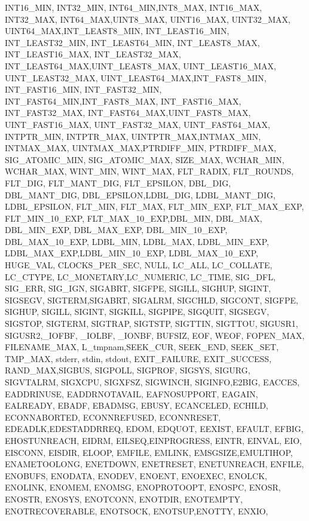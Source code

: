 {{        INT16_MIN, INT32_MIN, INT64_MIN,INT8_MAX, INT16_MAX,%
        INT32_MAX, INT64_MAX,UINT8_MAX, UINT16_MAX, UINT32_MAX,%
        UINT64_MAX,INT_LEAST8_MIN, INT_LEAST16_MIN, INT_LEAST32_MIN, INT_LEAST64_MIN,%
        INT_LEAST8_MAX, INT_LEAST16_MAX, INT_LEAST32_MAX, INT_LEAST64_MAX,UINT_LEAST8_MAX,%
        UINT_LEAST16_MAX, UINT_LEAST32_MAX, UINT_LEAST64_MAX,INT_FAST8_MIN, INT_FAST16_MIN,%
        INT_FAST32_MIN, INT_FAST64_MIN,INT_FAST8_MAX, INT_FAST16_MAX, INT_FAST32_MAX,%
        INT_FAST64_MAX,UINT_FAST8_MAX, UINT_FAST16_MAX, UINT_FAST32_MAX, UINT_FAST64_MAX,%
        INTPTR_MIN, INTPTR_MAX, UINTPTR_MAX,INTMAX_MIN, INTMAX_MAX,%
        UINTMAX_MAX,PTRDIFF_MIN, PTRDIFF_MAX, SIG_ATOMIC_MIN, SIG_ATOMIC_MAX,%
        SIZE_MAX, WCHAR_MIN, WCHAR_MAX, WINT_MIN, WINT_MAX,%
        FLT_RADIX, FLT_ROUNDS, FLT_DIG, FLT_MANT_DIG, FLT_EPSILON,%
        DBL_DIG, DBL_MANT_DIG, DBL_EPSILON,LDBL_DIG, LDBL_MANT_DIG,%
        LDBL_EPSILON, FLT_MIN, FLT_MAX, FLT_MIN_EXP, FLT_MAX_EXP,%
        FLT_MIN_10_EXP, FLT_MAX_10_EXP,DBL_MIN, DBL_MAX, DBL_MIN_EXP,%
        DBL_MAX_EXP, DBL_MIN_10_EXP, DBL_MAX_10_EXP, LDBL_MIN, LDBL_MAX,%
        LDBL_MIN_EXP, LDBL_MAX_EXP,LDBL_MIN_10_EXP, LDBL_MAX_10_EXP, HUGE_VAL,%
        CLOCKS_PER_SEC, NULL, LC_ALL, LC_COLLATE, LC_CTYPE,%
        LC_MONETARY,LC_NUMERIC, LC_TIME, SIG_DFL, SIG_ERR,%
        SIG_IGN, SIGABRT, SIGFPE, SIGILL, SIGHUP,%
        SIGINT, SIGSEGV, SIGTERM,SIGABRT, SIGALRM,%
        SIGCHLD, SIGCONT, SIGFPE, SIGHUP, SIGILL,%
        SIGINT, SIGKILL, SIGPIPE, SIGQUIT, SIGSEGV,%
        SIGSTOP, SIGTERM, SIGTRAP, SIGTSTP, SIGTTIN,%
        SIGTTOU, SIGUSR1, SIGUSR2,_IOFBF, _IOLBF,%
        _IONBF, BUFSIZ, EOF, WEOF, FOPEN_MAX,%
        FILENAME_MAX, L_tmpnam,SEEK_CUR, SEEK_END, SEEK_SET,%
        TMP_MAX, stderr, stdin, stdout, EXIT_FAILURE,%
        EXIT_SUCCESS, RAND_MAX,SIGBUS, SIGPOLL, SIGPROF,%
        SIGSYS, SIGURG, SIGVTALRM, SIGXCPU, SIGXFSZ,%
        SIGWINCH, SIGINFO,E2BIG, EACCES, EADDRINUSE,%
        EADDRNOTAVAIL, EAFNOSUPPORT, EAGAIN, EALREADY, EBADF,%
        EBADMSG, EBUSY, ECANCELED, ECHILD, ECONNABORTED,%
        ECONNREFUSED, ECONNRESET, EDEADLK,EDESTADDRREQ, EDOM,%
        EDQUOT, EEXIST, EFAULT, EFBIG, EHOSTUNREACH,%
        EIDRM, EILSEQ,EINPROGRESS, EINTR, EINVAL,%
        EIO, EISCONN, EISDIR, ELOOP, EMFILE,%
        EMLINK, EMSGSIZE,EMULTIHOP, ENAMETOOLONG, ENETDOWN,%
        ENETRESET, ENETUNREACH, ENFILE, ENOBUFS, ENODATA,%
        ENODEV, ENOENT, ENOEXEC, ENOLCK, ENOLINK,%
        ENOMEM, ENOMSG, ENOPROTOOPT, ENOSPC, ENOSR,%
        ENOSTR, ENOSYS, ENOTCONN, ENOTDIR, ENOTEMPTY,%
        ENOTRECOVERABLE, ENOTSOCK, ENOTSUP,ENOTTY, ENXIO,%
}}
